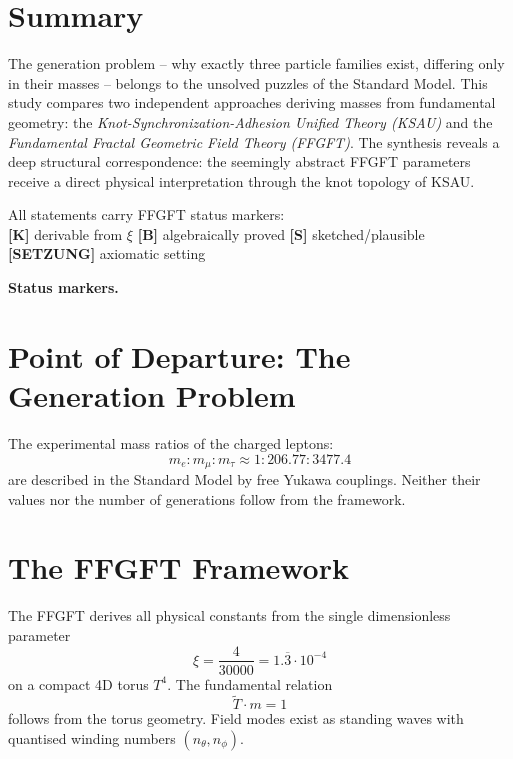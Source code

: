 
\section*{Summary}

The generation problem -- why exactly three particle families exist,
differing only in their masses -- belongs to the unsolved puzzles of
the Standard Model. This study compares two independent approaches
deriving masses from fundamental geometry: the
\emph{Knot-Synchronization-Adhesion Unified Theory (KSAU)} and the
\emph{Fundamental Fractal Geometric Field Theory (FFGFT)}. The
synthesis reveals a deep structural correspondence: the seemingly
abstract FFGFT parameters receive a direct physical interpretation
through the knot topology of KSAU.

\begin{keyresult}
All statements carry FFGFT status markers:\\
\textbf{[K]} derivable from $\xi$ \quad
\textbf{[B]} algebraically proved \quad
\textbf{[S]} sketched/plausible \quad
\textbf{[SETZUNG]} axiomatic setting
\end{keyresult}

\medskip\noindent\textbf{Status markers.}


\section{Point of Departure: The Generation Problem}

The experimental mass ratios of the charged leptons:
\begin{equation}
  m_e : m_\mu : m_\tau \approx 1 : 206.77 : 3477.4
\end{equation}
are described in the Standard Model by free Yukawa couplings.
Neither their values nor the number of generations follow from
the framework.

\section{The FFGFT Framework}

The FFGFT derives all physical constants from the single
dimensionless parameter
\begin{equation}
  \xi = \frac{4}{30000} = 1.\overline{3} \cdot 10^{-4}
\end{equation}
on a compact 4D torus $T^4$. The fundamental relation
\begin{equation}
  \tilde{T} \cdot m = 1
\end{equation}
follows from the torus geometry. Field modes exist as standing waves
with quantised winding numbers $(n_\theta, n_\phi)$.

